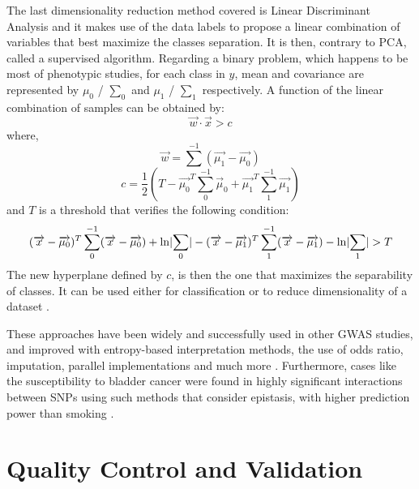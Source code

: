 The last dimensionality reduction method covered is Linear Discriminant Analysis and it makes use of the data labels to propose a linear combination of variables that best maximize the classes separation. It is then, contrary to \gls{PCA}, called a supervised algorithm. Regarding a binary problem, which happens to be most of phenotypic studies, for each class in $y$, mean and covariance are represented by $\mu_0$ / $\sum_0$ and $\mu_1$ / $\sum_1$ respectively. A function of the linear combination of samples can be obtained by:
\begin{equation}
\overrightarrow{w} \cdot \overrightarrow{x} > c
\end{equation} 
where, 
\begin{equation}
\overrightarrow{w} = \sum ^{-1}(\overrightarrow{\mu_1} - \overrightarrow{\mu_0})
\end{equation}
\begin{equation}
c = \frac{1}{2} (T - \overrightarrow{\mu_0}^T\sum_{0}^{-1} \overrightarrow{\mu}_0 + \overrightarrow{\mu_1}^T\sum_1^{-1}\overrightarrow{\mu_1})
\end{equation}
and $T$ is a threshold that verifies the following condition:
\begin{equation}
(\overrightarrow{x} - \overrightarrow{\mu_0})^T \sum_{0}^{-1}(\overrightarrow{x} - \overrightarrow{\mu_0}) + \ln \lvert\sum_0\rvert - (\overrightarrow{x} - \overrightarrow{\mu_1})^T \sum_{1}^{-1}(\overrightarrow{x} - \overrightarrow{\mu_1}) - \ln \lvert\sum_1\rvert > T
\end{equation}
The new hyperplane defined by $c$, is then the one that maximizes the separability of classes. It can be used either for classification or to reduce dimensionality of a dataset \cite{izenman2013linear}.

These approaches have been widely and successfully used in other \gls{GWAS} studies, and improved with entropy-based interpretation methods, the use of odds ratio, imputation, parallel implementations and much more \cite{moore2006flexible}. Furthermore, cases like the susceptibility to bladder cancer were found in highly significant interactions between \gls{SNP}s using such methods that consider epistasis, with higher prediction power than smoking \cite{stern2009polymorphisms}. 


\section{Quality Control and Validation}

